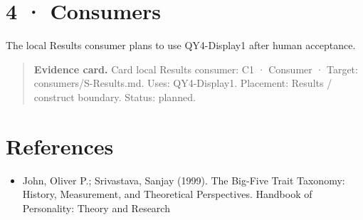 \documentclass[11pt]{article}
\begin{document}
\section*{4 · Consumers}
The local Results consumer plans to use QY4-Display1 after human acceptance.

\begin{quote}\footnotesize\textbf{Evidence card.} Card local Results consumer: C1 · Consumer · Target: consumers/S-Results.md. Uses: QY4-Display1. Placement: Results / construct boundary. Status: planned.\end{quote}
\section{References}\begin{itemize}
\item John, Oliver P.; Srivastava, Sanjay (1999). The Big-Five Trait Taxonomy: History, Measurement, and Theoretical Perspectives. Handbook of Personality: Theory and Research
\end{itemize}
\end{document}
